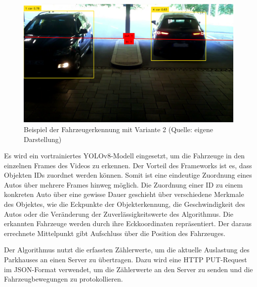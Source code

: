 \begin{figure}[h]
	\myImagePos{}
	\includegraphics[width=\myImageWidth]{Bilder/Method3_Beispiel.png}
	\caption[Fahrzeugerkennung Variante 2 Beispiel]{Beispiel der Fahrzeugerkennung mit Variante 2 (Quelle: eigene Darstellung)}
	\label{fig:Variante2}
\end{figure}

Es wird ein vortrainiertes YOLOv8-Modell eingesetzt, um die Fahrzeuge in den einzelnen Frames des Videos zu erkennen.
Der Vorteil des Frameworks ist es, dass Objekten IDs zuordnet werden können.
Somit ist eine eindeutige Zuordnung eines Autos über mehrere Frames hinweg möglich.
Die Zuordnung einer ID zu einem konkreten Auto über eine gewisse Dauer geschieht über verschiedene Merkmale des Objektes, wie die Eckpunkte der Objekterkennung, die Geschwindigkeit des Autos oder die Veränderung der Zuverlässigkeitswerte des Algorithmus.
Die erkannten Fahrzeuge werden durch ihre Eckkoordinaten repräsentiert.
Der daraus errechnete Mittelpunkt gibt Aufschluss über die Position des Fahrzeuges.

Der Algorithmus nutzt die erfassten Zählerwerte, um die aktuelle Auslastung des Parkhauses an einen Server zu übertragen.
Dazu wird eine HTTP PUT-Request im JSON-Format verwendet, um die Zählerwerte an den Server zu senden und die Fahrzeugbewegungen zu protokollieren.